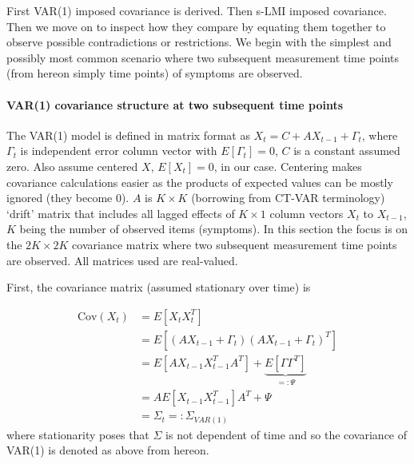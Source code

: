 \documentclass[
  letterpaper,
  DIV=11,
  numbers=noendperiod]{scrartcl}
\let\oldparagraph\paragraph
\renewcommand{\paragraph}[1]{\oldparagraph{#1}\mbox{}}
\begin{document}
First VAR(1) imposed covariance is derived. Then s-LMI imposed
covariance. Then we move on to inspect how they compare by equating them
together to observe possible contradictions or restrictions. We begin
with the simplest and possibly most common scenario where two subsequent
measurement time points (from hereon simply time points) of symptoms are
observed.

\hypertarget{var1-covariance-structure-at-two-subsequent-time-points}{%
\paragraph{VAR(1) covariance structure at two subsequent time
points}\label{var1-covariance-structure-at-two-subsequent-time-points}}

The VAR(1) model is defined in matrix format as
\(X_{t}=C+AX_{t-1}+\Gamma_t\), where \(\Gamma_t\) is independent error
column vector with \(E[\Gamma_t]=0\), \(C\) is a constant assumed zero.
Also assume centered \(X\), \(E[X_t]=0\), in our case. Centering makes
covariance calculations easier as the products of expected values can be
mostly ignored (they become 0). \(A\) is \(K \times K\) (borrowing from
CT-VAR terminology) `drift' matrix that includes all lagged effects of
\(K\times1\) column vectors \(X_t\) to \(X_{t-1}\), \(K\) being the
number of observed items (symptoms). In this section the focus is on the
\(2K\times2K\) covariance matrix where two subsequent measurement time
points are observed. All matrices used are real-valued.

First, the covariance matrix (assumed stationary over time) is

\[
\begin{align*}
\text{Cov}(X_t) &= E[X_tX_t^T] \\
&= E[(AX_{t-1}+\Gamma_t)(AX_{t-1}+\Gamma_t)^T] \\
&= E[AX_{t-1}X_{t-1}^TA^T] + \underbrace{E[\Gamma \Gamma^T]}_{=: \Psi} \\
&= AE[X_{t-1}X_{t-1}^T]A^T + \Psi \\
&= \Sigma_t=:\Sigma_{VAR(1)}
\end{align*}
\] where stationarity poses that \(\Sigma\) is not dependent of time and
so the covariance of VAR(1) is denoted as above from hereon.
\end{document}
